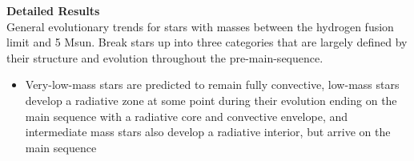 \textbf{Detailed Results} \\
General evolutionary trends for stars with masses between the hydrogen fusion limit and 5 Msun. Break stars up into three categories that are largely defined by their structure and evolution throughout the pre-main-sequence. 
\begin{itemize}
 \item[]
Very-low-mass stars are predicted to remain fully convective, 
low-mass stars develop a radiative zone at some point during their evolution ending on the main sequence with a radiative core and convective envelope, and intermediate mass stars also develop a radiative interior, but arrive on the main sequence
\end{itemize}